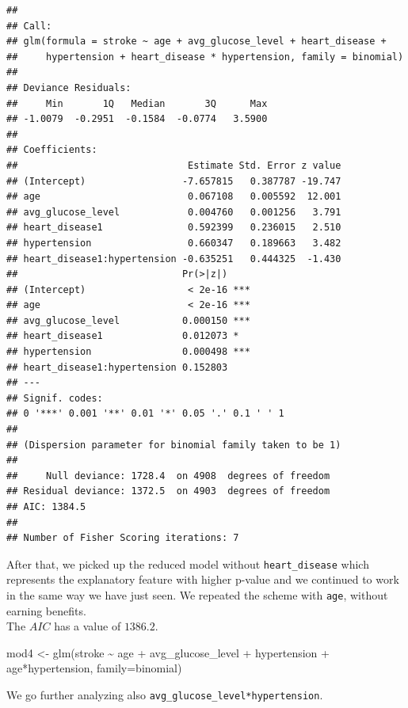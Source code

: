 \documentclass[
]{article}
\newenvironment{Shaded}{\begin{snugshade}}{\end{snugshade}}
\newcommand{\AttributeTok}[1]{\textcolor[rgb]{0.77,0.63,0.00}{#1}}
\newcommand{\FunctionTok}[1]{\textcolor[rgb]{0.00,0.00,0.00}{#1}}
\newcommand{\NormalTok}[1]{#1}
\newcommand{\OtherTok}[1]{\textcolor[rgb]{0.56,0.35,0.01}{#1}}
\newcommand{\SpecialCharTok}[1]{\textcolor[rgb]{0.00,0.00,0.00}{#1}}
\begin{document}
\begin{verbatim}
## 
## Call:
## glm(formula = stroke ~ age + avg_glucose_level + heart_disease + 
##     hypertension + heart_disease * hypertension, family = binomial)
## 
## Deviance Residuals: 
##     Min       1Q   Median       3Q      Max  
## -1.0079  -0.2951  -0.1584  -0.0774   3.5900  
## 
## Coefficients:
##                              Estimate Std. Error z value
## (Intercept)                 -7.657815   0.387787 -19.747
## age                          0.067108   0.005592  12.001
## avg_glucose_level            0.004760   0.001256   3.791
## heart_disease1               0.592399   0.236015   2.510
## hypertension                 0.660347   0.189663   3.482
## heart_disease1:hypertension -0.635251   0.444325  -1.430
##                             Pr(>|z|)    
## (Intercept)                  < 2e-16 ***
## age                          < 2e-16 ***
## avg_glucose_level           0.000150 ***
## heart_disease1              0.012073 *  
## hypertension                0.000498 ***
## heart_disease1:hypertension 0.152803    
## ---
## Signif. codes:  
## 0 '***' 0.001 '**' 0.01 '*' 0.05 '.' 0.1 ' ' 1
## 
## (Dispersion parameter for binomial family taken to be 1)
## 
##     Null deviance: 1728.4  on 4908  degrees of freedom
## Residual deviance: 1372.5  on 4903  degrees of freedom
## AIC: 1384.5
## 
## Number of Fisher Scoring iterations: 7
\end{verbatim}

After that, we picked up the reduced model without \texttt{heart\_disease}
which represents the explanatory feature with higher p-value and we
continued to work in the same way we have just seen. We repeated the
scheme with \texttt{age}, without earning benefits.\\
The \(AIC\) has a value of \(1386.2\).

\begin{Shaded}
\begin{Highlighting}[]
\NormalTok{mod4 }\OtherTok{\textless{}{-}} \FunctionTok{glm}\NormalTok{(stroke }\SpecialCharTok{\textasciitilde{}}\NormalTok{ age }\SpecialCharTok{+}\NormalTok{ avg\_glucose\_level }\SpecialCharTok{+}\NormalTok{ hypertension }\SpecialCharTok{+}\NormalTok{ age}\SpecialCharTok{*}\NormalTok{hypertension,}
              \AttributeTok{family=}\NormalTok{binomial)}
\end{Highlighting}
\end{Shaded}

We go further analyzing also \texttt{avg\_glucose\_level*hypertension}.
\end{document}
